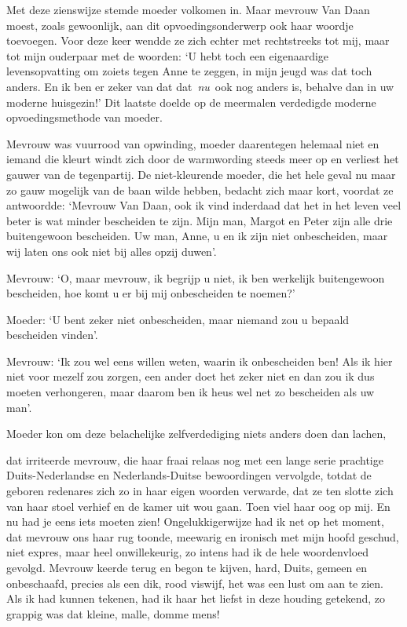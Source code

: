 \documentclass{book}
\begin{document}
Met deze zienswijze stemde moeder volkomen in. Maar mevrouw Van Daan moest,
zoals gewoonlijk, aan dit opvoedingsonderwerp ook haar woordje toevoegen. Voor
deze keer wendde ze zich echter met rechtstreeks tot mij, maar tot mijn
ouderpaar met de woorden: `U hebt toch een eigenaardige levensopvatting om
zoiets tegen Anne te zeggen, in mijn jeugd was dat toch anders. En ik ben er
zeker van dat dat~\emph{nu}~ook nog anders is, behalve dan in uw moderne
huisgezin!' Dit laatste doelde op de meermalen verdedigde moderne
opvoedingsmethode van moeder.

Mevrouw was vuurrood van opwinding, moeder daarentegen helemaal niet en iemand
die kleurt windt zich door de warmwording steeds meer op en verliest het gauwer
van de tegenpartij. De niet-kleurende moeder, die het hele geval nu maar zo gauw
mogelijk van de baan wilde hebben, bedacht zich maar kort, voordat ze
antwoordde: `Mevrouw Van Daan, ook ik vind inderdaad dat het in het leven veel
beter is wat minder bescheiden te zijn. Mijn man, Margot en Peter zijn alle drie
buitengewoon bescheiden. Uw man, Anne, u en ik zijn niet onbescheiden, maar wij
laten ons ook niet bij alles opzij duwen'.

Mevrouw: `O, maar mevrouw, ik begrijp u niet, ik ben werkelijk buitengewoon
bescheiden, hoe komt u er bij mij onbescheiden te noemen?'

Moeder: `U bent zeker niet onbescheiden, maar niemand zou u bepaald bescheiden
vinden'.

Mevrouw: `Ik zou wel eens willen weten, waarin ik onbescheiden ben! Als ik hier
niet voor mezelf zou zorgen, een ander doet het zeker niet en dan zou ik dus
moeten verhongeren, maar daarom ben ik heus wel net zo bescheiden als uw man'.

Moeder kon om deze belachelijke zelfverdediging niets anders doen dan lachen,

dat irriteerde mevrouw, die haar fraai relaas nog met een lange serie prachtige
Duits-Nederlandse en Nederlands-Duitse bewoordingen vervolgde, totdat de geboren
redenares zich zo in haar eigen woorden verwarde, dat ze ten slotte zich van
haar stoel verhief en de kamer uit wou gaan. Toen viel haar oog op mij. En nu
had je eens iets moeten zien!  Ongelukkigerwijze had ik net op het moment, dat
mevrouw ons haar rug toonde, meewarig en ironisch met mijn hoofd geschud, niet
expres, maar heel onwillekeurig, zo intens had ik de hele woordenvloed gevolgd.
Mevrouw keerde terug en begon te kijven, hard, Duits, gemeen en onbeschaafd,
precies als een dik, rood viswijf, het was een lust om aan te zien. Als ik had
kunnen tekenen, had ik haar het liefst in deze houding getekend, zo grappig was
dat kleine, malle, domme mens!
\end{document}
